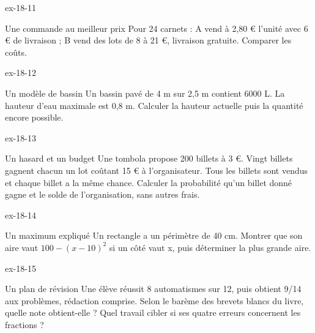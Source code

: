 \clearpage{}
\begin{blocLivre}{ex-18-11}\begin{exercice}[3]{Une commande au meilleur prix}
Pour 24 carnets : A vend à 2,80 € l’unité avec 6 € de livraison ; B vend des lots de 8 à 21 €, livraison gratuite. Comparer les coûts.
\end{exercice}\end{blocLivre}
\begin{blocLivre}{ex-18-12}\begin{exercice}[3]{Un modèle de bassin}
Un bassin pavé de 4 m sur 2,5 m contient 6000 L. La hauteur d’eau maximale est 0,8 m. Calculer la hauteur actuelle puis la quantité encore possible.
\label{fig-ex-18-12}
\end{exercice}\end{blocLivre}
\begin{blocLivre}{ex-18-13}\begin{exercice}[3]{Un hasard et un budget}
Une tombola propose 200 billets à 3 €. Vingt billets gagnent chacun un lot coûtant 15 € à l’organisateur. Tous les billets sont vendus et chaque billet a la même chance. Calculer la probabilité qu’un billet donné gagne et le solde de l’organisation, sans autres frais.
\end{exercice}\end{blocLivre}
\begin{blocLivre}{ex-18-14}\begin{exercice}[3]{Un maximum expliqué}
Un rectangle a un périmètre de 40 cm. Montrer que son aire vaut $100-(x-10)^2$ si un côté vaut x, puis déterminer la plus grande aire.
\label{fig-ex-18-14}
\end{exercice}\end{blocLivre}
\begin{blocLivre}{ex-18-15}\begin{exercice}[3]{Un plan de révision}
Une élève réussit 8 automatismes sur 12, puis obtient 9/14 aux problèmes, rédaction comprise. Selon le barème des brevets blancs du livre, quelle note obtient-elle ? Quel travail cibler si ses quatre erreurs concernent les fractions ?
\end{exercice}\end{blocLivre}

\clearpage
